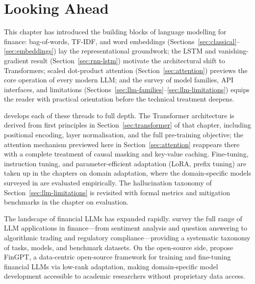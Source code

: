 \section{Looking Ahead}
\label{sec:intro-looking-ahead}


\begin{context}

This chapter has introduced the building blocks of language modelling for finance:
bag-of-words, TF-IDF, and word embeddings (Sections~\ref{sec:classical}–\ref{sec:embeddings})
lay the representational groundwork; the LSTM and vanishing-gradient result
(Section~\ref{sec:rnn-lstm}) motivate the architectural shift to Transformers;
scaled dot-product attention (Section~\ref{sec:attention}) previews the core
operation of every modern LLM; and the survey of model families, API interfaces,
and limitations (Sections~\ref{sec:llm-families}–\ref{sec:llm-limitations}) equips
the reader with practical orientation before the technical treatment deepens.

 develops each of these threads to full depth.
The Transformer architecture is derived from first principles in
Section~\ref{sec:transformer} of that chapter, including positional encoding,
layer normalisation, and the full pre-training objective; the attention
mechanism previewed here in Section~\ref{sec:attention} reappears there with a
complete treatment of causal masking and key-value caching.  Fine-tuning, instruction tuning, and
parameter-efficient adaptation (LoRA, prefix tuning) are taken up in the chapters
on domain adaptation, where the domain-specific models surveyed in
 are evaluated empirically.
The hallucination taxonomy of Section~\ref{sec:llm-limitations} is revisited
with formal metrics and mitigation benchmarks in the chapter on evaluation.

The landscape of financial LLMs has expanded rapidly.  \citet{li2023llmfinsurvey} survey the full range of LLM applications in finance---from
sentiment analysis and question answering to algorithmic trading and regulatory
compliance---providing a systematic taxonomy of tasks, models, and benchmark datasets.
On the open-source side, \citet{Yang2023} propose FinGPT, a
data-centric open-source framework for training and fine-tuning financial LLMs via
low-rank adaptation, making domain-specific model development accessible to academic
researchers without proprietary data access.


\end{context}
